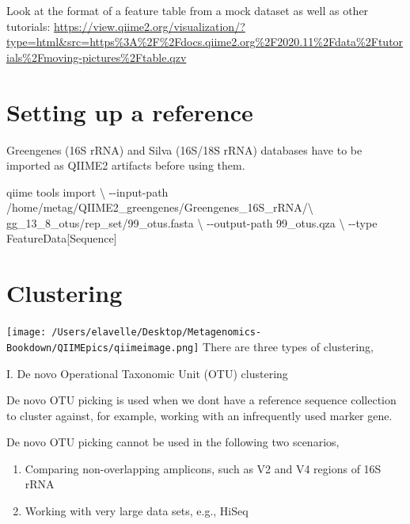 \documentclass[
]{book}
\newenvironment{Shaded}{\begin{snugshade}}{\end{snugshade}}
\newcommand{\DataTypeTok}[1]{\textcolor[rgb]{0.13,0.29,0.53}{#1}}
\newcommand{\ExtensionTok}[1]{#1}
\newcommand{\NormalTok}[1]{#1}
\begin{document}
Look at the format of a feature table from a mock dataset as well as other tutorials:
\url{https://view.qiime2.org/visualization/?type=html\&src=https\%3A\%2F\%2Fdocs.qiime2.org\%2F2020.11\%2Fdata\%2Ftutorials\%2Fmoving-pictures\%2Ftable.qzv}

\hypertarget{setting-up-a-reference}{%
\section{Setting up a reference}\label{setting-up-a-reference}}

Greengenes (16S rRNA) and Silva (16S/18S rRNA) databases have to be imported as QIIME2 artifacts before using them.

\begin{Shaded}
\begin{Highlighting}[]

\ExtensionTok{qiime}\NormalTok{ tools import }\DataTypeTok{\textbackslash{}}
\NormalTok{{-}{-}input{-}path /home/metag/QIIME2\_greengenes/Greengenes\_16S\_rRNA/}\DataTypeTok{\textbackslash{}}
\NormalTok{gg\_13\_8\_otus/rep\_set/99\_otus.fasta }\DataTypeTok{\textbackslash{}}
\NormalTok{{-}{-}output{-}path 99\_otus.qza }\DataTypeTok{\textbackslash{}}
\NormalTok{{-}{-}type FeatureData[Sequence]}
\end{Highlighting}
\end{Shaded}

\hypertarget{clustering-1}{%
\section{Clustering}\label{clustering-1}}

\texttt{[image: /Users/elavelle/Desktop/Metagenomics-Bookdown/QIIMEpics/qiimeimage.png]}
There are three types of clustering,

I. De novo Operational Taxonomic Unit (OTU) clustering

De novo OTU picking is used when we dont have a reference sequence collection to cluster against, for example, working with an infrequently used marker gene.

De novo OTU picking cannot be used in the following two scenarios,

\begin{enumerate}
\def\labelenumi{\arabic{enumi}.}
\item
  Comparing non-overlapping amplicons, such as V2 and V4 regions of 16S rRNA
\item
  Working with very large data sets, e.g., HiSeq
\end{enumerate}
\end{document}
